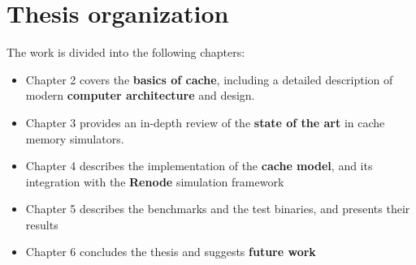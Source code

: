 \section{Thesis organization}
The work is divided into the following chapters:
\begin{itemize}
  \item Chapter 2 covers the \textbf{basics of cache}, including a detailed description of modern \textbf{computer architecture} and design.
  \item Chapter 3 provides an in-depth review of the \textbf{state of the art} in cache memory simulators.
  \item Chapter 4 describes the implementation of the \textbf{cache model}, and its integration with the \textbf{Renode} simulation framework
  \item Chapter 5 describes the benchmarks and the test binaries, and presents their results
  \item Chapter 6 concludes the thesis and suggests \textbf{future work}
\end{itemize}
